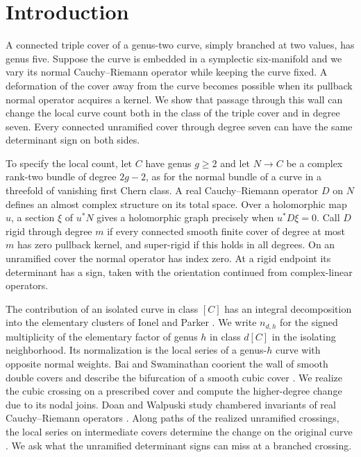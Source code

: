 \section{Introduction}\label{sec:intro}
A connected triple cover of a genus-two curve, simply branched at two
values, has genus five. Suppose the curve is embedded in a symplectic
six-manifold and we vary its normal Cauchy--Riemann operator while
keeping the curve fixed. A deformation of the cover away from the
curve becomes possible when its pullback normal operator acquires a
kernel. We show that passage through this wall can change the local
curve count both in the class of the triple cover and in degree seven. Every
connected unramified cover through degree seven
can have the same determinant sign on both sides.

To specify the local count, let \(C\) have genus \(g\ge2\) and let
\(N\to C\) be a complex rank-two bundle of degree \(2g-2\), as for the
normal bundle of a curve in a threefold of vanishing first Chern class.
A real Cauchy--Riemann operator \(D\) on \(N\) defines an almost
complex structure on its total space. Over a holomorphic map \(u\),
a section \(\xi\) of \(u^*N\) gives a holomorphic graph precisely when
\(u^*D\xi=0\).
Call \(D\) rigid through degree \(m\) if every connected smooth finite
cover of degree at most \(m\) has zero pullback kernel, and super-rigid
if this holds in all degrees. On an unramified cover the normal
operator has index zero. At a rigid endpoint its determinant has
a sign, taken with the orientation continued from complex-linear operators.

The contribution of an isolated curve in class \([C]\) has an integral
decomposition into the elementary clusters of Ionel and Parker
\cite{ip,diw,WueProduct}. We write \(n_{d,h}\) for the signed multiplicity
of the elementary factor of genus \(h\) in class \(d[C]\) in the
isolating neighborhood. Its normalization is the local series of a
genus-\(h\) curve with opposite normal weights. Bai and Swaminathan coorient the wall of smooth double covers and
describe the bifurcation of a smooth cubic cover
\cite[Theorem~4.12(ii)]{bai}. We realize the cubic crossing on a
prescribed cover and compute the higher-degree change due to its nodal
joins. Doan and Walpuski study chambered invariants of real
Cauchy--Riemann operators \cite{dw}. Along paths of the realized unramified crossings, the local series on
intermediate covers determine the change on the original curve
\cite[Theorems~4.1 and~7.1]{WueUnramified}. We ask what the unramified determinant signs can miss
at a branched crossing.

